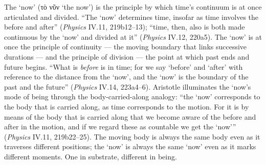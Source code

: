 \documentclass{article}
\newcommand{\gk}[1]{{\greekfont #1}}
\begin{document}
The `now' (\gk{τὸ νῦν} `the now') is the principle by which time's continuum is at once articulated and divided. ``The `now' determines time, insofar as time involves the before and after'' (\textit{Physics} IV.11, 219b12--13); ``time, then, also is both made continuous by the `now' and divided at it'' (\textit{Physics} IV.12, 220a5). The `now' is at once the principle of continuity --- the moving boundary that links successive durations --- and the principle of division --- the point at which past ends and future begins. ``What is \textit{before} is in time; for we say `before' and `after' with reference to the distance from the `now', and the `now' is the boundary of the past and the future'' (\textit{Physics} IV.14, 223a4--6). Aristotle illuminates the `now's mode of being through the body-carried-along analogy: ``the `now' corresponds to the body that is carried along, as time corresponds to the motion. For it is by means of the body that is carried along that we become aware of the before and after in the motion, and if we regard these as countable we get the `now''' (\textit{Physics} IV.11, 219b22--25). The moving body is always the same body even as it traverses different positions; the `now' is always the same `now' even as it marks different moments. One in substrate, different in being.
\end{document}
